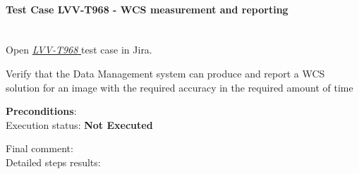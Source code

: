 \documentclass[DM,lsstdraft,STR,toc]{lsstdoc}
\begin{document}
\paragraph{Test Case LVV-T968 - WCS measurement and reporting
 }\mbox{}\\

Open  \href{https://jira.lsstcorp.org/secure/Tests.jspa#/testCase/LVV-T968}{\textit{ LVV-T968 } }
test case in Jira.

Verify that the Data Management system can produce and report a WCS
solution for an image with the required accuracy in the required amount
of time


\textbf{ Preconditions}:\\


Execution status: {\bf Not Executed }

Final comment:\\


Detailed steps results:
\end{document}

